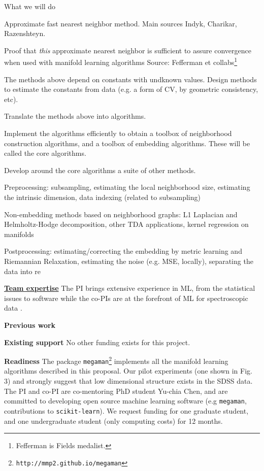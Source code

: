 \documentclass[floatfix,11pt]{article}
\begin{document}
What we will do
\bit
\item Approximate fast nearest neighbor method. Main sources Indyk, Charikar, Razenshteyn. 
\item Proof that {\em this} approximate nearest neighbor is sufficient to assure convergence when used with manifold learning algorithms Source: Fefferman et collabs\footnote{Fefferman is Fields medalist.} 
\item The methods above depend on constants with undknown values. Design methods to estimate the constants from data (e.g. a form of CV, by geometric consistency, etc).
\item Translate the methods above into algorithms. 
\item Implement the algorithms efficiently to obtain a toolbox of neighborhood construction algorithms, and a toolbox of embedding algorithms. These will be called the core algorithms. 
\item Develop around the core algorithms a suite of other methods.
 \bit
 \item Preprocessing: subsampling, estimating the local neighborhood size, estimating the intrinsic dimension, data indexing (related to subsampling)
 \item Non-embedding methods based on neighborhood graphs: L1 Laplacian and Helmholtz-Hodge decomposition, other TDA applications, kernel regression on manifolds
 \item Postprocessing: estimating/correcting the embedding by metric learning and Riemannian Relaxation, estimating the noise (e.g. MSE, locally), separating the data into re
 \eit
\eit

\underline{\bf Team expertise}
The PI brings extensive experience in ML, from the statistical issues \cite{PerraultMMcQueen:nips17} to software  while the co-PIs are at the forefront of ML for spectroscopic data \cite{vanderplasConnolly:09}.

{\bf Previous work}

{\bf Existing support} No other funding exists for this project. 

{\bf Readiness} The package {\tt megaman}\footnote{{\tt http://mmp2.github.io/megaman}} \cite{mcqueenMVdpZ:megaman16,*mcqueenMVdpZ:megaman-jmlr16} implements all the manifold learning algorithms described in this proposal. Our pilot experiments (one shown in Fig. 3) and \cite{Yip04} strongly suggest that low dimensional structure exists in the SDSS data. The PI and co-PI are co-mentoring PhD student Yu-chia Chen, and are committed to developing open source machine learning software (e.g {\tt megaman}, contributions to {\tt scikit-learn}). We request funding for one graduate student, and one undergraduate student (only computing costs) for 12 months.
\end{document}
